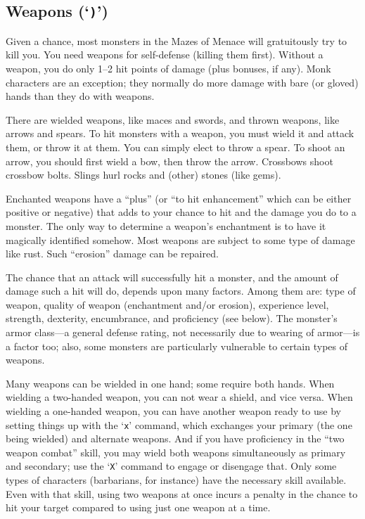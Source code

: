 \subsection*{Weapons (`{\tt )}')}

Given a chance, most monsters in the Mazes of Menace will gratuitously try to
kill you.
You need weapons for self-defense (killing them first).
Without a
weapon, you do only 1--2 hit points of damage (plus bonuses, if any).
Monk characters are an exception; they normally do more damage with
bare (or gloved) hands than they do with weapons.

There are wielded weapons, like maces and swords, and thrown weapons,
like arrows and spears.  To hit monsters with a weapon, you must wield it and
attack them, or throw it at them.  You can simply elect to throw a spear.
To shoot an arrow, you should first wield a bow, then throw the arrow.
Crossbows shoot crossbow bolts.  Slings hurl rocks and (other) stones
(like gems).

Enchanted weapons have a ``plus'' (or ``to hit enhancement'' which can be
either positive or negative) that adds to your chance to
hit and the damage you do to a monster.  The only way to determine a weapon's
enchantment is to have it magically identified somehow.
Most weapons are subject to some type of damage like rust.  Such
``erosion'' damage can be repaired.

The chance that an attack will successfully hit a monster, and the amount
of damage such a hit will do, depends upon many factors.  Among them are:
type of weapon, quality of weapon (enchantment and/or erosion), experience
level, strength, dexterity, encumbrance, and proficiency (see below).  The
monster's armor class---a general defense rating, not necessarily due to
wearing of armor---is a factor too; also, some monsters are particularly
vulnerable to certain types of weapons.

Many weapons can be wielded in one hand; some require both hands.
When wielding a two-handed weapon, you can not wear a shield, and
vice versa.  When wielding a one-handed weapon, you can have another
weapon ready to use by setting things up with the `{\tt x}' command, which
exchanges your primary (the one being wielded) and alternate weapons.
And if you have proficiency in the ``two weapon combat'' skill, you
may wield both weapons simultaneously as primary and secondary; use the
`{\tt X}' command to engage or disengage that.
Only some types of characters (barbarians, for instance) have the necessary
skill available.  Even with that skill, using two weapons at once incurs
a penalty in the chance to hit your target compared to using just one
weapon at a time.

